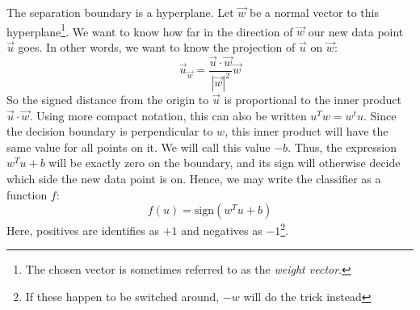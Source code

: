\documentclass[12pt, a4paper]{article}
\numberwithin{equation}{section}
\begin{document}
The separation boundary is a hyperplane. Let $\vec{w}$ be a normal vector to this hyperplane\footnote{The chosen vector is sometimes referred to as the \textit{weight vector}.}. We want to know how far in the direction of $\vec{w}$ our new data point $\vec{u}$ goes. In other words, we want to know the projection of $\vec{u}$ on $\vec{w}$:
\begin{equation}
\vec{u}_{\vec{w}}=\frac{\vec{u}\cdot\vec{w}}{|\vec{w}|^2}\vec{w}
\end{equation}
So the signed distance from the origin to $\vec{u}$ is proportional to the inner product $\vec{u}\cdot\vec{w}$. Using more compact notation, this can also be written $u^T w=w^t u$. Since the decision boundary is perpendicular to $w$, this inner product will have the same value for all points on it. We will call this value $-b$. Thus, the expression $w^T u+b$ will be exactly zero on the boundary, and its sign will otherwise decide which side the new data point is on. Hence, we may write the classifier as a function $f$:
\begin{equation}
f(u)=\textrm{sign}(w^T u+b)
\end{equation}
Here, positives are identifies as $+1$ and negatives as $-1$\footnote{If these happen to be switched around, $-w$ will do the trick instead}.
\end{document}
